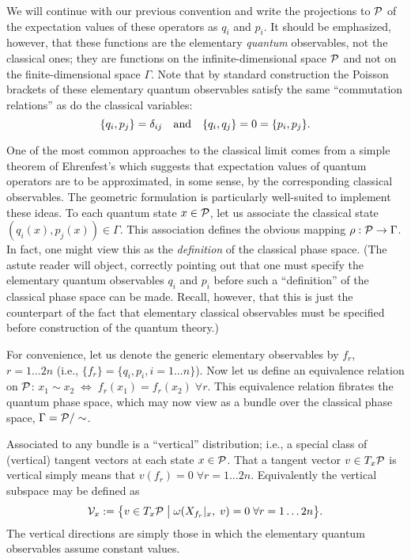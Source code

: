 \documentclass[12pt,aps,eqsecnum,tighten]{revtex4-2}
\def\be{\begin{equation}}
\def\ee{\end{equation}}
\def\iff{\Leftrightarrow}
\def\P{{\cal P}}
\def\w{\omega}
\newcommand{\hvf}[1]{{X_{#1}}}
\begin{document}
We will continue with our previous convention and write the
projections to $\P$ of the expectation values of these operators as
$q_i$ and $p_i$. It should be emphasized, however, that these
functions are the elementary {\em quantum} observables, not the
classical ones; they are functions on the infinite-dimensional space
$\P$ and not on the finite-dimensional space $\Gamma$. Note that by
standard construction the Poisson brackets of these elementary quantum
observables satisfy the same ``commutation relations'' as do the
classical variables:
%
\be \{q_i,
p_j\} = \delta_{ij} \quad {\rm and} \quad \{q_i, q_j\} = 0 = \{p_i,
p_j\}.  
\ee
%

One of the most common approaches to the classical limit comes from a
simple theorem of Ehrenfest's which suggests that expectation values of
quantum operators are to be approximated, in some sense, by the
corresponding classical observables.  The geometric formulation is
particularly well-suited to implement these ideas.  To each
quantum state $x\in\P$, let us associate the classical state $(q_i(x),
p_j(x)) \in \Gamma$.  This association defines the obvious mapping
$\rho:\P \rightarrow \Gamma$.  In fact, one might view this as the
{\em definition} of the classical phase space.  (The astute reader will
object, correctly pointing out that one must specify the elementary
quantum observables $q_i$ and $p_i$ before such a ``definition'' of
the classical phase space can be made. Recall, however, that this is
just the counterpart of the fact that elementary classical observables
must be specified before construction of the quantum theory.)

For convenience, let us denote the generic elementary observables by
$f_r$, $r=1 \ldots 2n$ (i.e., $\{f_r\} = \{q_i, p_i, i=1 \ldots n\}$).
Now let us define an equivalence relation on $\P$: $x_1 \sim x_2 \;
\iff \; f_r(x_1)=f_r(x_2) \; \forall r$.  This equivalence relation
fibrates the quantum phase space, which may now view as a bundle over the
classical phase space, $\Gamma = \P/\sim$.

Associated to any bundle is a ``vertical'' distribution; i.e., a
special class of (vertical) tangent vectors at each state $x\in\P$.
That a tangent vector $v \in T_x\P$ is vertical simply means that
$v(f_r) = 0 \; \forall r=1 \ldots 2n$.  Equivalently the vertical
subspace may be defined as
%
\be
{\cal V}_x := \big\{ v\in T_x \P \; \big| \;
\w(\hvf{f_r}|_x, \; v) = 0 \; \forall r=1 \ldots 2n \big\} .
\ee
%
The vertical directions are simply those in which the elementary
quantum observables assume constant values.
\end{document}
